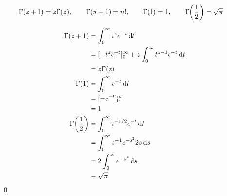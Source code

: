 \documentclass[uplatex,dvipdfmx,a4paper,11pt]{jlreq}
\makeatletter
\theoremstyle{definition}
\renewenvironment{proof}[1][\proofname]{\par
  \normalfont
  \topsep6\p@\@plus6\p@ \trivlist
  \item[\hskip\labelsep{\bfseries #1}\@addpunct{\bfseries}]\ignorespaces\quad\par
}{%
  \qed\endtrivlist\@endpefalse
}
\renewcommand\proofname{証明}
\makeatother
\begin{document}
\begin{proposition}
  \begin{align}
    \Gamma(z + 1) & = z\Gamma(z), \qquad \Gamma(n + 1) = n!, \qquad \Gamma(1) = 1, \qquad \Gamma\qty(\frac{1}{2}) = \sqrt{\pi}
  \end{align}
\end{proposition}
\begin{proof}
  \begin{align}
    \Gamma(z + 1)           & = \int_0^\infty t^{z}e^{-t}\dd{t}                              \\
                            & = [-t^{z}e^{-t}]_0^\infty + z\int_0^\infty t^{z-1}e^{-t}\dd{t} \\
                            & = z\Gamma(z)                                                   \\
    \Gamma(1)               & = \int_0^\infty e^{-t}\dd{t}                                   \\
                            & = [-e^{-t}]_0^\infty                                           \\
                            & = 1                                                            \\
    \Gamma\qty(\frac{1}{2}) & = \int_0^\infty t^{-1/2}e^{-t}\dd{t}                           \\
                            & = \int_0^\infty s^{-1}e^{-s^2}2s\dd{s}                         \\
                            & = 2\int_0^\infty e^{-s^2}\dd{s}                                \\
                            & = \sqrt{\pi}
  \end{align}
\end{proof}
\end{document}
